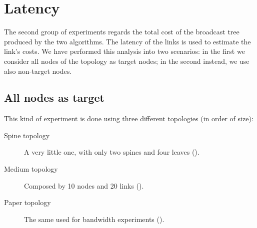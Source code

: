 \section{Latency}\label{sec:latency}

The second group of experiments regards the total cost of the broadcast tree
produced by the two algorithms. The latency of the links is used to estimate
the link's costs. We have performed this analysis into two scenarios: in the
first we consider all nodes of the topology as target nodes; in the second
instead, we use also non-target nodes.

\subsection{All nodes as target}

This kind of experiment is done using three different topologies (in order of
size):
\begin{description}
	\item[Spine topology] A very little one, with only two spines and four
		leaves ().
	\item[Medium topology] Composed by 10 nodes and 20 links
		().
	\item [Paper topology] The same used for bandwidth experiments
		().
\end{description}


